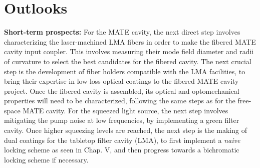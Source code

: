 \section*{Outlooks}

\noindent \textbf{Short-term prospects:} For the MATE cavity, the next direct step involves characterizing the laser-machined LMA fibers in order to make the fibered MATE cavity input coupler. This involves measuring their mode field diameter and radii of curvature to select the best candidates for the fibered cavity. The next crucial step is the development of fiber holders compatible with the LMA facilities, to bring their expertise in low-loss optical coatings to the fibered MATE cavity project. Once the fibered cavity is assembled, its optical and optomechanical properties will need to be characterized, following the same steps as for the free-space MATE cavity. For the squeezed light source, the next step involves mitigating the pump noise at low frequencies, by implementing a green filter cavity. Once higher squeezing levels are reached, the next step is the making of dual coatings for the tabletop filter cavity (LMA), to first implement a \textit{naive} locking scheme as seen in Chap. V, and then progress towards a bichromatic locking scheme if necessary. \\

